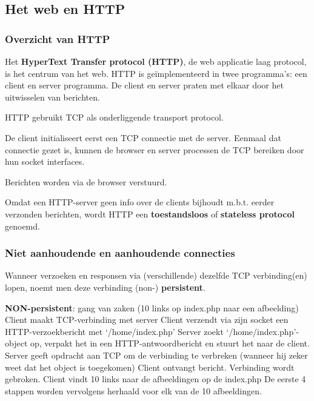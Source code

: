 \subsection{Het web en HTTP}

\subsubsection{Overzicht van HTTP}

Het \textbf{HyperText Transfer protocol (HTTP)}, de web applicatie laag protocol, is het centrum van het web. HTTP is geïmplementeerd in twee programma’s: een client en server programma. De client en server praten met elkaar door het uitwisselen van berichten.

HTTP gebruikt TCP als onderliggende transport protocol. 

De client initialiseert eerst een TCP connectie met de server. Eenmaal dat connectie gezet is, kunnen de browser en server processen de TCP bereiken door hun socket interfaces.

Berichten worden via de browser verstuurd.

Omdat een HTTP-server geen info over de clients bijhoudt m.b.t. eerder verzonden berichten, wordt HTTP een \textbf{toestandsloos} of \textbf{stateless protocol} genoemd.

\subsubsection{Niet aanhoudende en aanhoudende connecties}


Wanneer verzoeken en responsen via (verschillende) dezelfde TCP verbinding(en) lopen, noemt men deze verbinding (non-) \textbf{persistent}.

\textbf{NON-persistent}: gang van zaken (10 links op index.php naar een afbeelding)
\be
\itf Client maakt TCP-verbinding met server
\itf Client verzendt via zijn socket een HTTP-verzoekbericht met ‘/home/index.php’
\itf Server zoekt ‘/home/index.php’-object op, verpakt het in een HTTP-antwoordbericht en stuurt het naar de client.
\itf Server geeft opdracht aan TCP om de verbinding te verbreken (wanneer hij zeker weet dat het object is toegekomen)
\itf Client ontvangt bericht. Verbinding wordt gebroken. Client vindt 10 links naar de afbeeldingen op de index.php
\itf De eerste 4 stappen worden vervolgens herhaald voor elk van de 10 afbeeldingen.
\ee

